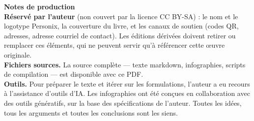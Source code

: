 \clearpage
\thispagestyle{empty}
\begin{flushleft}\small\sffamily
\textbf{Notes de production}\\[1.2em]

\textbf{Réservé par l'auteur} (non couvert par la licence CC BY-SA) : le
nom et le logotype Personix, la couverture du livre, et les canaux de soutien
(codes QR, adresses, adresse courriel de contact). Les éditions dérivées doivent
retirer ou remplacer ces éléments, qui ne peuvent servir qu'à référencer cette
œuvre originale.\\[1.2em]

\textbf{Fichiers sources.} La source complète --- texte markdown, infographies,
scripts de compilation --- est disponible avec ce PDF.\\[1.2em]

\textbf{Outils.} Pour préparer le texte et itérer sur les formulations, l'auteur
a eu recours à l'assistance d'outils d'IA. Les infographies ont été conçues
en collaboration avec des outils génératifs, sur la base des spécifications de
l'auteur. Toutes les idées, tous les arguments et toutes les conclusions sont
les siens.
\end{flushleft}
\clearpage
